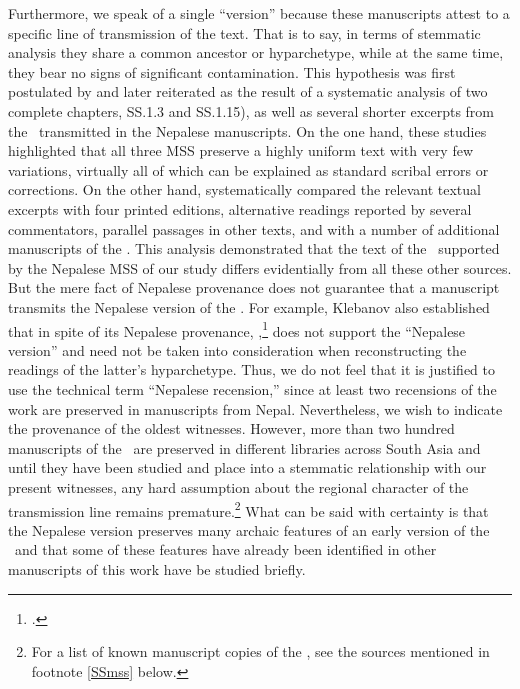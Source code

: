 Furthermore, we speak of a single “version” because these manuscripts attest to a
specific line of transmission of the text.  That is to say, in terms of stemmatic
analysis they share a common ancestor or hyparchetype, while at the same time,
they bear no signs of significant contamination.  This hypothesis was first
postulated by \citet{kleb-2010} and later reiterated \citet{kleb-2021a} as the
result of a systematic analysis of two complete chapters, SS.1.3 and SS.1.15), as
well as several shorter excerpts from the \SS\ transmitted in the Nepalese
manuscripts. On the one hand, these studies highlighted that all three MSS
preserve a highly uniform text with very few variations, virtually all of which
can be explained as standard scribal errors or corrections. On the other hand,
\citet{kleb-2010,kleb-2021a} systematically compared the relevant textual excerpts
with four printed editions, alternative readings reported by several commentators,
parallel passages in other texts, and with a number of additional manuscripts of
the \SS. This analysis demonstrated that the text of the \SS\ supported by the
Nepalese MSS of our study differs evidentially from all these other sources. But
the mere fact of Nepalese provenance does not guarantee that a manuscript
transmits the Nepalese version of the \SS.  For example, Klebanov also established
that in spite of its Nepalese provenance, ,\footcite{rima-2022} does not support the “Nepalese version” and need not
be taken into consideration when reconstructing the readings of the latter's
hyparchetype.  Thus, we do not feel that it is justified to use the technical term
“Nepalese recension,” since at least two recensions of the work are preserved in
manuscripts from Nepal.  Nevertheless, we wish to indicate the provenance of the
oldest witnesses. However, more than two hundred manuscripts of the \SS\ are
preserved in different libraries across South Asia and until they have been
studied and place into a stemmatic relationship with our present witnesses, any
hard assumption about the regional character of the transmission line remains
premature.\footnote{For a list of known manuscript copies of the \SS, see the
    sources mentioned in footnote \ref{SSmss} below.} What can be said with certainty
    is that the Nepalese version preserves many archaic features of an early version
    of the \SS\ and that some of these features have already been identified in other
    manuscripts of this work have be studied briefly.%

